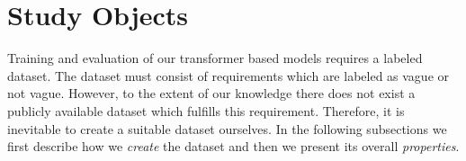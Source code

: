 \section{Study Objects}
\label{chp:study:sec:study_objects}


Training and evaluation of our transformer based models requires a labeled dataset.
The dataset must consist of requirements which are labeled as vague or not vague.
However, to the extent of our knowledge there does not exist a publicly available dataset which fulfills this requirement.
Therefore, it is inevitable to create a suitable dataset ourselves.
In the following subsections we first describe how we \textit{create} the dataset and then we present its overall \textit{properties}.



